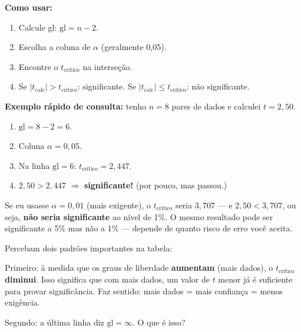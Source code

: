\begin{BoardBox}
\medskip
\textbf{Como usar:}
\begin{enumerate}
  \item Calcule gl: $\text{gl} = n - 2$.
  \item Escolha a coluna de $\alpha$ (geralmente 0,05).
  \item Encontre o $t_{\text{crítico}}$ na interseção.
  \item Se $|t_{\text{calc}}| > t_{\text{crítico}}$: significante.
  Se $|t_{\text{calc}}| \leq t_{\text{crítico}}$: não significante.
\end{enumerate}

\textbf{Exemplo rápido de consulta:}
tenho $n = 8$ pares de dados e calculei $t = 2{,}50$.
\begin{enumerate}
  \item $\text{gl} = 8 - 2 = 6$.
  \item Coluna $\alpha = 0{,}05$.
  \item Na linha $\text{gl} = 6$: $t_{\text{crítico}} = 2{,}447$.
  \item $2{,}50 > 2{,}447$ $\Rightarrow$ \textbf{significante!}
  (por pouco, mas passou.)
\end{enumerate}
Se eu usasse $\alpha = 0{,}01$ (mais exigente), o $t_{\text{crítico}}$
seria $3{,}707$ --- e $2{,}50 < 3{,}707$, ou seja, \textbf{não seria
significante} ao nível de 1\%. O mesmo resultado pode ser significante a
5\% mas não a 1\% --- depende de quanto risco de erro você aceita.
\end{BoardBox}

Percebam dois padrões importantes na tabela:

Primeiro: à medida que os graus de liberdade \textbf{aumentam} (mais dados),
o $t_{\text{crítico}}$ \textbf{diminui}. Isso significa que com mais dados,
um valor de $t$ menor já é suficiente para provar significância.
Faz sentido: mais dados = mais confiança = menos exigência.

Segundo: a última linha diz $\text{gl} = \infty$.
O que é isso?

